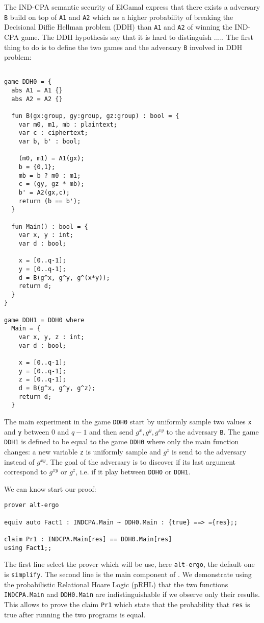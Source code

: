The IND-CPA semantic security of ElGamal express that there exists a 
adversary \verb+B+ build on top of \verb+A1+ and \verb+A2+ which as a higher 
probability of breaking the Decisional Diffie Hellman problem (DDH) than
\verb+A1+ and \verb+A2+ of winning the IND-CPA game. The DDH hypothesis 
say that it is hard to distinguish .....
The first thing to do is to define the two games and the 
adversary \verb+B+ involved in DDH problem:
\begin{verbatim}

game DDH0 = {
  abs A1 = A1 {}
  abs A2 = A2 {}
  
  fun B(gx:group, gy:group, gz:group) : bool = {
    var m0, m1, mb : plaintext;
    var c : ciphertext;
    var b, b' : bool;
 
    (m0, m1) = A1(gx);
    b = {0,1};
    mb = b ? m0 : m1;
    c = (gy, gz * mb);
    b' = A2(gx,c);
    return (b == b');
  }

  fun Main() : bool = {
    var x, y : int;
    var d : bool;

    x = [0..q-1];
    y = [0..q-1];
    d = B(g^x, g^y, g^(x*y));
    return d;
  }     
}

game DDH1 = DDH0 where 
  Main = {
    var x, y, z : int;
    var d : bool;

    x = [0..q-1];
    y = [0..q-1];
    z = [0..q-1];
    d = B(g^x, g^y, g^z);
    return d;
  } 

\end{verbatim}
The main experiment in the game \verb+DDH0+ start by uniformly sample
two values \verb+x+ and \verb+y+ between 0 and $q-1$ and then 
send $g^x, g^y, g^{xy}$ to the adversary \verb+B+. The game \verb+DDH1+
is defined to be equal to the game \verb+DDH0+ where only the main function
changes: a new variable \verb+z+ is uniformly sample and $g^z$ is send
to the adversary instead of $g^{xy}$. The goal of the adversary is to discover
if its last argument correspond to $g^{xy}$ or $g^z$, i.e. if it play
between \verb+DDH0+ or \verb+DDH1+.

We can know start our proof:
\begin{verbatim}
prover alt-ergo

equiv auto Fact1 : INDCPA.Main ~ DDH0.Main : {true} ==> ={res};;

claim Pr1 : INDCPA.Main[res] == DDH0.Main[res] 
using Fact1;;
\end{verbatim}
The first line select the prover which will be use, here \verb+alt-ergo+, the
default one is \verb+simplify+. The second line is the main component of
\easycrypt. We demonstrate using the probabilistic Relational Hoare Logic (pRHL)
that the two functions \verb+INDCPA.Main+ and \verb+DDH0.Main+ are 
indistinguishable if we observe only their results.
This allows to prove the claim \verb+Pr1+ which state that the probability
that \verb+res+ is true after running the two programs is equal.

